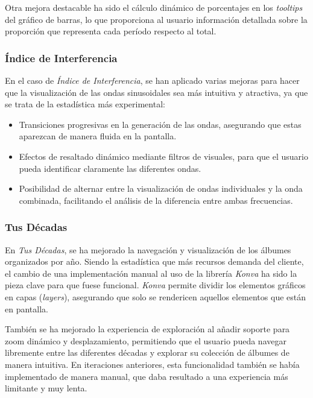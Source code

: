 Otra mejora destacable ha sido el cálculo dinámico de porcentajes en los \textit{tooltips} del gráfico de barras, lo que proporciona al usuario información detallada sobre la proporción que representa cada período respecto al total.

\subsubsection*{Índice de Interferencia}

En el caso de \textit{Índice de Interferencia}, se han aplicado varias mejoras para hacer que la visualización de las ondas sinusoidales sea más intuitiva y atractiva, ya que se trata de la estadística más experimental:

\begin{itemize}
    \item Transiciones progresivas en la generación de las ondas, asegurando que estas aparezcan de manera fluida en la pantalla.
    \item Efectos de resaltado dinámico mediante filtros de visuales, para que el usuario pueda identificar claramente las diferentes ondas.
    \item Posibilidad de alternar entre la visualización de ondas individuales y la onda combinada, facilitando el análisis de la diferencia entre ambas frecuencias.
\end{itemize}

\subsubsection*{Tus Décadas}

En \textit{Tus Décadas}, se ha mejorado la navegación y visualización de los álbumes organizados por año. Siendo la estadística que más recursos demanda del cliente, el cambio de una implementación manual al uso de la librería \textit{Konva} ha sido la pieza clave para que fuese funcional. \textit{Konva} permite dividir los elementos gráficos en capas (\textit{layers}), asegurando que solo se rendericen aquellos elementos que están en pantalla.

También se ha mejorado la experiencia de exploración al añadir soporte para zoom dinámico y desplazamiento, permitiendo que el usuario pueda navegar libremente entre las diferentes décadas y explorar su colección de álbumes de manera intuitiva. En iteraciones anteriores, esta funcionalidad también se había implementado de manera manual, que daba resultado a una experiencia más limitante y muy lenta.


